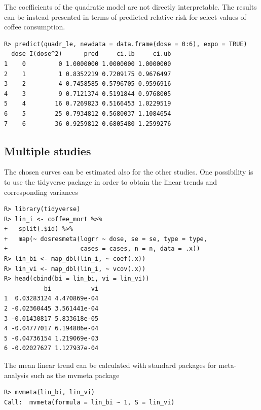 \documentclass[11pt,a4paper,twoside,openany]{book}\usepackage{knitr}
\newcommand{\pkg}[1]{{\fontseries{b}\selectfont #1}}
\begin{document}
{\noindent The coefficients of the quadratic model are not directly interpretable. The results can be instead presented in terms of predicted relative risk for select values of coffee consumption.
\begin{knitrout}\footnotesize
{}\color{fgcolor}\begin{kframe}
\begin{verbatim}
R> predict(quadr_le, newdata = data.frame(dose = 0:6), expo = TRUE)
  dose I(dose^2)      pred     ci.lb     ci.ub
1    0         0 1.0000000 1.0000000 1.0000000
2    1         1 0.8352219 0.7209175 0.9676497
3    2         4 0.7458585 0.5796705 0.9596916
4    3         9 0.7121374 0.5191844 0.9768005
5    4        16 0.7269823 0.5166453 1.0229519
6    5        25 0.7934812 0.5680037 1.1084654
7    6        36 0.9259812 0.6805480 1.2599276
\end{verbatim}
\end{kframe}
\end{knitrout}

\subsection{Multiple studies}

The chosen curves can be estimated also for the other studies. One possibility is to use the \pkg{tidyverse} package \citep{tidyverse} in order to obtain the linear trends and corresponding variances

\begin{knitrout}\footnotesize
{}\color{fgcolor}\begin{kframe}
\begin{verbatim}
R> library(tidyverse)
R> lin_i <- coffee_mort %>%
+   split(.$id) %>%
+   map(~ dosresmeta(logrr ~ dose, se = se, type = type,
+                    cases = cases, n = n, data = .x))
R> lin_bi <- map_dbl(lin_i, ~ coef(.x))
R> lin_vi <- map_dbl(lin_i, ~ vcov(.x))
R> head(cbind(bi = lin_bi, vi = lin_vi))
           bi           vi
1  0.03283124 4.470869e-04
2 -0.02360445 3.561441e-04
3 -0.01430817 5.833618e-05
4 -0.04777017 6.194806e-04
5 -0.04736154 1.219069e-03
6 -0.02027627 1.127937e-04
\end{verbatim}
\end{kframe}
\end{knitrout}

\noindent The mean linear trend can be calculated with standard packages for meta-analysis such as the \pkg{mvmeta} package \citep{gasparrini2012multivariate}
\begin{knitrout}\footnotesize
{}\color{fgcolor}\begin{kframe}
\begin{verbatim}
R> mvmeta(lin_bi, lin_vi)
Call:  mvmeta(formula = lin_bi ~ 1, S = lin_vi)


\end{verbatim}
\end{kframe}
\end{knitrout}}
\end{document}
